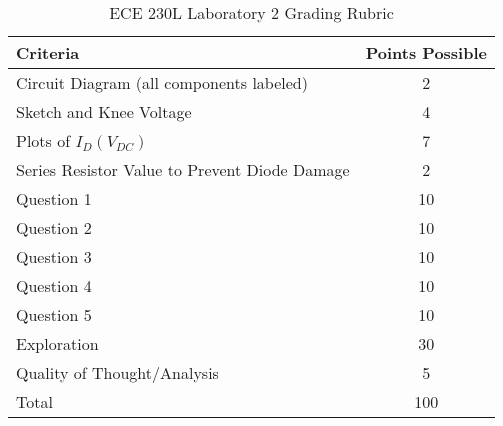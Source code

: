 \documentclass[12pt]{../manual}
\begin{document}
{}
\hspace{0pt}
\vfill %
\begin{table}[ht!]
\caption{ECE 230L Laboratory 2 Grading Rubric}
\centering
\begin{tabular}{l|c} \hline
Criteria & Points Possible \\ \hline \hline
Circuit Diagram (all components labeled) 			& 2 \\ \hline
Sketch and Knee Voltage								& 4 \\ \hline
Plots of $I_D(V_{DC})$								& 7 \\ \hline
Series Resistor Value to Prevent Diode Damage		& 2 \\ \hline
Question 1											& 10 \\ \hline
Question 2											& 10 \\ \hline
Question 3											& 10 \\ \hline
Question 4											& 10 \\ \hline
Question 5											& 10 \\ \hline
Exploration											& 30 \\ \hline
Quality of Thought/Analysis							& 5 \\ \hline
Total												& 100 \\ \hline
\end{tabular}
\end{table}
\vfill %
\end{document}
